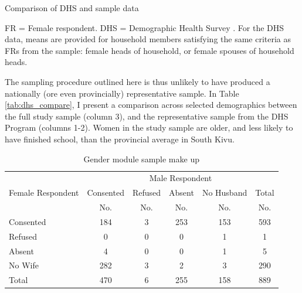 \begin{table}
\centering
\begin{threeparttable}
	\caption{Comparison of DHS and sample data}\label{tab:dhs_compare}
	\centering
	\singlespace
	
	\begin{tablenotes}
	\small
	\item FR = Female respondent. DHS = Demographic Health Survey \citep{DHSCongoReport}. For the DHS data, means are provided for household members satisfying the same criteria as FRs from the sample: female heads of household, or female spouses of household heads. 
	\item
	\end{tablenotes}
\end{threeparttable}
\end{table}

The sampling procedure outlined here is thus unlikely to have produced a nationally (ore even provincially) representative sample. In Table \ref{tab:dhs_compare}, I present a comparison across selected demographics between the full study sample (column 3), and the representative sample from the DHS Program (columns 1-2). Women in the study sample are older, and less likely to have finished school, than the provincial average in South Kivu.

\begin{table}[tb]
\centering
\caption{Gender module sample make up}
\label{tab:bargsample}
\begin{tabular}{l c c c c c}
\toprule
 & \multicolumn{5}{c}{Male Respondent} \\
Female Respondent&Consented&Refused&Absent&No Husband&Total \\
&No.&No.&No.&No.&No. \\
\hline
Consented&184&3&253&153&593 \\
Refused&0&0&0&1&1 \\
Absent&4&0&0&1&5 \\
No Wife&282&3&2&3&290 \\
Total&470&6&255&158&889 \\
\bottomrule
\end{tabular}
\end{table}

